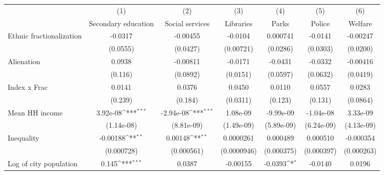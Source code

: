{
\def\sym#1{\ifmmode^{#1}\else\(^{#1}\)\fi}
\begin{tabular}{l*{6}{c}}
\hline\hline
                    &\multicolumn{1}{c}{(1)}&\multicolumn{1}{c}{(2)}&\multicolumn{1}{c}{(3)}&\multicolumn{1}{c}{(4)}&\multicolumn{1}{c}{(5)}&\multicolumn{1}{c}{(6)}\\
                    &\multicolumn{1}{c}{Secondary education}&\multicolumn{1}{c}{Social services}&\multicolumn{1}{c}{Libraries}&\multicolumn{1}{c}{Parks}&\multicolumn{1}{c}{Police}&\multicolumn{1}{c}{Welfare}\\
\hline
Ethnic fractionalization&     -0.0317         &    -0.00455         &     -0.0104         &    0.000741         &     -0.0141         &    -0.00247         \\
                    &    (0.0555)         &    (0.0427)         &   (0.00721)         &    (0.0286)         &    (0.0303)         &    (0.0200)         \\
[1em]
Alienation          &      0.0938         &    -0.00811         &     -0.0171         &     -0.0431         &     -0.0332         &    -0.00416         \\
                    &     (0.116)         &    (0.0892)         &    (0.0151)         &    (0.0597)         &    (0.0632)         &    (0.0419)         \\
[1em]
Index x Frac        &      0.0141         &      0.0376         &      0.0450         &      0.0110         &      0.0557         &      0.0283         \\
                    &     (0.239)         &     (0.184)         &    (0.0311)         &     (0.123)         &     (0.131)         &    (0.0864)         \\
[1em]
Mean HH income      &    3.92e-08\sym{***}&   -2.94e-08\sym{***}&    1.08e-09         &   -9.99e-09         &   -1.04e-08         &    3.33e-09         \\
                    &  (1.14e-08)         &  (8.81e-09)         &  (1.49e-09)         &  (5.89e-09)         &  (6.24e-09)         &  (4.13e-09)         \\
[1em]
Inequality          &    -0.00188\sym{**} &     0.00148\sym{**} &   0.0000261         &    0.000489         &    0.000510         &   -0.000354         \\
                    &  (0.000728)         &  (0.000561)         & (0.0000946)         &  (0.000375)         &  (0.000397)         &  (0.000263)         \\
[1em]
Log of city population&       0.145\sym{***}&      0.0387         &    -0.00155         &     -0.0393\sym{*}  &     -0.0140         &      0.0196         \\

\end{tabular}}
